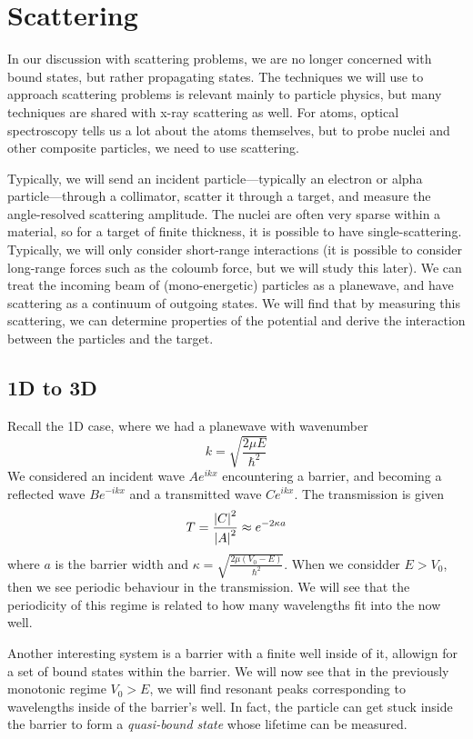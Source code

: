 \chapter{Scattering}
In our discussion with scattering problems, we are no longer concerned with bound states, but rather propagating states. The techniques we will use to approach scattering problems is relevant mainly to particle physics, but many techniques are shared with x-ray scattering as well. For atoms, optical spectroscopy tells us a lot about the atoms themselves, but to probe nuclei and other composite particles, we need to use scattering.

Typically, we will send an incident particle---typically an electron or alpha particle---through a collimator, scatter it through a target, and measure the angle-resolved scattering amplitude. The nuclei are often very sparse within a material, so for a target of finite thickness, it is possible to have single-scattering. Typically, we will only consider short-range interactions (it is possible to consider long-range forces such as the coloumb force, but we will study this later). We can treat the incoming beam of (mono-energetic) particles as a planewave, and have scattering as a continuum of outgoing states. We will find that by measuring this scattering, we can determine properties of the potential and derive the interaction between the particles and the target.

\section{1D to 3D}
Recall the 1D case, where we had a planewave with wavenumber
\[k = \sqrt{\frac{2\mu E}{\hbar^2}}\]
We considered an incident wave \(Ae^{ikx}\) encountering a barrier, and becoming a reflected wave \(Be^{-ikx}\) and a transmitted wave \(Ce^{ikx}\). The transmission is given
\[T = \frac{\left|C\right|^2}{\left|A\right|^2}\approx e^{-2\kappa a}\]
where \(a\) is the barrier width and \(\kappa = \sqrt{\frac{2\mu (V_0-E)}{\hbar^2}}\). When we considder \(E>V_0\), then we see periodic behaviour in the transmission. We will see that the periodicity of this regime is related to how many wavelengths fit into the now well.

Another interesting system is a barrier with a finite well inside of it, allowign for a set of bound states within the barrier. We will now see that in the previously monotonic regime \(V_0>E\), we will find resonant peaks corresponding to wavelengths inside of the barrier's well. In fact, the particle can get stuck inside the barrier to form a \emph{quasi-bound state} whose lifetime can be measured.

